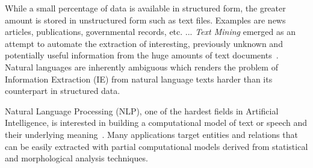 \documentclass[a4,12pt]{report}
\begin{document}

While a small percentage of data %
is available in structured form, the greater amount is stored in unstructured form such as  
text files.
Examples are news articles, publications, governmental records, etc. ...
{\em Text Mining} emerged as an attempt to automate the extraction of interesting, 
previously unknown and potentially useful information
from the huge amounts of text documents~\cite{Witten:08}.
Natural languages are inherently ambiguous which renders the problem of 
Information Extraction (IE) from natural language texts harder than 
its counterpart in structured data.

Natural Language Processing (NLP), one of the hardest fields in Artificial Intelligence,
is interested in building a computational model of text or speech
and their underlying meaning~\cite{sharp:01}. 
Many applications target entities and relations that can be 
easily extracted with partial computational models derived from
statistical and morphological analysis techniques.
\end{document}
